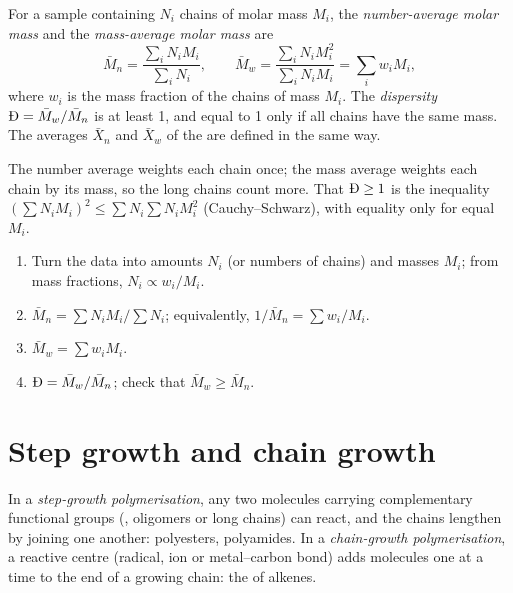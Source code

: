 \begin{definition}\label{def:b2:polymer-synthesis:averages}
For a sample containing $N_i$ chains of molar mass $M_i$, the \emph{number-average molar
mass} and the \emph{mass-average molar mass}
are
\begin{equation*}
\bar M_n = \frac{\sum_i N_i M_i}{\sum_i N_i}, \qquad
\bar M_w = \frac{\sum_i N_i M_i^2}{\sum_i N_i M_i} = \sum_i w_i M_i,
\end{equation*}
where $w_i$ is the mass fraction of the chains of mass $M_i$. The \emph{dispersity}
$\text{\DH} = \bar M_w/\bar M_n$ is at least 1, and equal to 1 only if all chains have the same
mass. The averages $\bar X_n$ and $\bar X_w$ of the  are defined in the same
way.
\end{definition}

The number average weights each chain once; the mass average weights each chain by its mass, so the
long chains count more. That $\text{\DH} \ge 1$ is the inequality $\left(\sum N_i M_i\right)^2 \le
\sum N_i \sum N_i M_i^2$ (Cauchy--Schwarz), with equality only for equal $M_i$.

\begin{method}\label{met:b2:polymer-synthesis:averages}
\begin{enumerate}
  \item Turn the data into amounts $N_i$ (or numbers of chains) and masses $M_i$; from mass fractions,
        $N_i \propto w_i/M_i$.
  \item $\bar M_n = \sum N_i M_i / \sum N_i$; equivalently, $1/\bar M_n = \sum w_i/M_i$.
  \item $\bar M_w = \sum w_i M_i$.
  \item $\text{\DH} = \bar M_w/\bar M_n$; check that $\bar M_w \ge \bar M_n$.
\end{enumerate}
\end{method}

\section{Step growth and chain growth}

\begin{definition}\label{def:b2:polymer-synthesis:step-chain}
In a \emph{step-growth polymerisation}, any two molecules carrying
complementary functional groups (, oligomers or long chains) can react, and the chains
lengthen by joining one another: polyesters, polyamides. In a \emph{chain-growth
polymerisation}, a reactive centre (radical, ion or metal--carbon
bond) adds  molecules one at a time to the end of a growing chain: the  of alkenes.
\end{definition}

